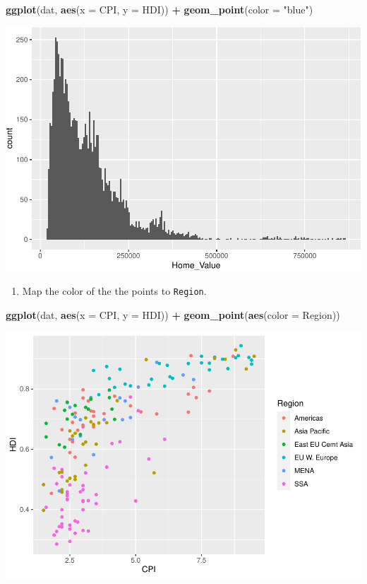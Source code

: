 \documentclass[
]{book}
\newenvironment{Shaded}{\begin{snugshade}}{\end{snugshade}}
\newcommand{\DataTypeTok}[1]{\textcolor[rgb]{0.13,0.29,0.53}{#1}}
\newcommand{\KeywordTok}[1]{\textcolor[rgb]{0.13,0.29,0.53}{\textbf{#1}}}
\newcommand{\NormalTok}[1]{#1}
\newcommand{\OperatorTok}[1]{\textcolor[rgb]{0.81,0.36,0.00}{\textbf{#1}}}
\newcommand{\StringTok}[1]{\textcolor[rgb]{0.31,0.60,0.02}{#1}}
\providecommand{\tightlist}{%
  \setlength{\itemsep}{0pt}\setlength{\parskip}{0pt}}
\begin{document}
\begin{alert}
\begin{Shaded}
\begin{Highlighting}[]
\KeywordTok{ggplot}\NormalTok{(dat, }\KeywordTok{aes}\NormalTok{(}\DataTypeTok{x =}\NormalTok{ CPI, }\DataTypeTok{y =}\NormalTok{ HDI)) }\OperatorTok{+}
\StringTok{  }\KeywordTok{geom\_point}\NormalTok{(}\DataTypeTok{color =} \StringTok{"blue"}\NormalTok{)}
\end{Highlighting}
\end{Shaded}

\includegraphics{R/Rgraphics/figures/unnamed-chunk-161-1.pdf}

\begin{enumerate}
\def\labelenumi{\arabic{enumi}.}
\setcounter{enumi}{2}
\tightlist
\item
  Map the color of the the points to \texttt{Region}.
\end{enumerate}

\begin{Shaded}
\begin{Highlighting}[]
\KeywordTok{ggplot}\NormalTok{(dat, }\KeywordTok{aes}\NormalTok{(}\DataTypeTok{x =}\NormalTok{ CPI, }\DataTypeTok{y =}\NormalTok{ HDI)) }\OperatorTok{+}
\StringTok{  }\KeywordTok{geom\_point}\NormalTok{(}\KeywordTok{aes}\NormalTok{(}\DataTypeTok{color =}\NormalTok{ Region))}
\end{Highlighting}
\end{Shaded}

\includegraphics{R/Rgraphics/figures/unnamed-chunk-162-1.pdf}


\end{alert}
\end{document}
